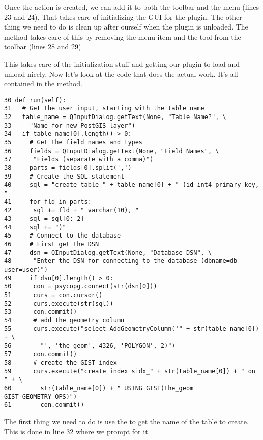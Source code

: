 Once the action is created, we can add it to both the toolbar and the  menu (lines 23 and 24).
That takes care of initializing the GUI for the plugin.
The other thing we need to do is clean up after ourself when the plugin is unloaded.
The  method takes care of this by removing the menu item and the tool from the toolbar (lines 28 and 29).

This takes care of the initialization stuff and getting our plugin to load and unload nicely.
Now let's look at the code that does the actual work.
It's all contained in the  method.

\begin{verbatim}
30 def run(self): 
31   # Get the user input, starting with the table name
32   table_name = QInputDialog.getText(None, "Table Name?", \
33     "Name for new PostGIS layer")
34   if table_name[0].length() > 0:
35     # Get the field names and types
36     fields = QInputDialog.getText(None, "Field Names", \
37      "Fields (separate with a comma)")
38     parts = fields[0].split(',')
39     # Create the SQL statement
40     sql = "create table " + table_name[0] + " (id int4 primary key, "
41     for fld in parts:
42      sql += fld + " varchar(10), "
43     sql = sql[0:-2]
44     sql += ")"
45     # Connect to the database
46     # First get the DSN
47     dsn = QInputDialog.getText(None, "Database DSN", \
48      "Enter the DSN for connecting to the database (dbname=db user=user)")
49     if dsn[0].length() > 0:
50      con = psycopg.connect(str(dsn[0]))
51      curs = con.cursor()
52      curs.execute(str(sql))
53      con.commit()
54      # add the geometry column
55      curs.execute("select AddGeometryColumn('" + str(table_name[0]) + \
56        "', 'the_geom', 4326, 'POLYGON', 2)")
57      con.commit()
58      # create the GIST index
59      curs.execute("create index sidx_" + str(table_name[0]) + " on " + \
60        str(table_name[0]) + " USING GIST(the_geom GIST_GEOMETRY_OPS)")
61        con.commit()
\end{verbatim}

The first thing we need to do is use the \classname{QInputDialog} to get the name of the table to create.
This is done in line 32 where we prompt for it.


